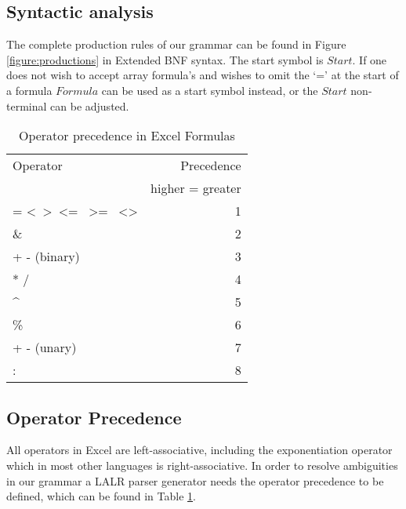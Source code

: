 \documentclass[conference]{IEEEtran}
\begin{document}
\subsection{Syntactic analysis}
\label{subsection:productionRules}

The complete production rules of our grammar can be found in Figure \ref{figure:productions} in Extended BNF syntax. The start symbol is $Start$. If one does not wish to accept array formula's and wishes to omit the `=' at the start of a formula $Formula$ can be used as a start symbol instead, or the $Start$ non-terminal can be adjusted.

\begin{table}
\label{table:operatorprec}
\caption{Operator precedence in Excel Formulas}
\begin{tabular}{lr}
Operator                                                                & Precedence \\
 & higher = greater \\
= \textless \  \textgreater \  \textless= \  \textgreater= \  \textless\textgreater & 1          \\
\&                                                                      & 2          \\
+ - (binary)                                                            & 3          \\
* /                                                                     & 4          \\
\textasciicircum                                                        & 5          \\
\%                                                                      & 6          \\
+ - (unary)                                                             & 7          \\
: \texttt{\char32}                                                             & 8         
\end{tabular}
\end{table}

\subsection{Operator Precedence}

All operators in Excel are left-associative, including the exponentiation operator which in most other languages is right-associative.
In order to resolve ambiguities in our grammar a LALR parser generator needs the operator precedence to be defined, which can be found in Table \ref{table:operatorprec}.
\end{document}
